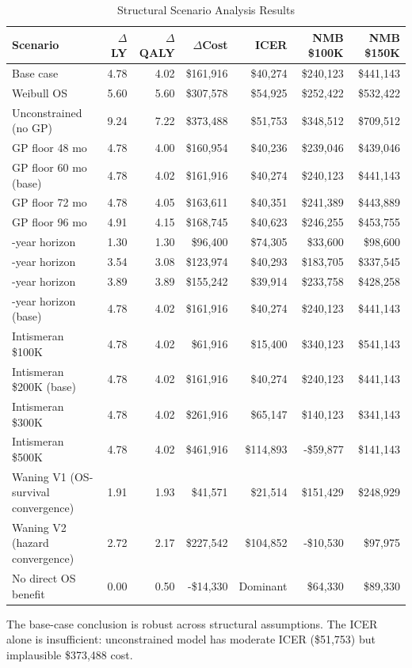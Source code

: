 \documentclass[11pt,a4paper]{article}
\begin{document}
\begin{landscape}
\begin{table}[p]
\centering
\caption{Structural Scenario Analysis Results}
\label{tab:s13}
\footnotesize
\setlength{\tabcolsep}{5pt}
\begin{tabularx}{\linewidth}{@{}>{\raggedright\arraybackslash}Xrrrrrr@{}}
\toprule
\textbf{Scenario} & \textbf{$\Delta$LY} & \textbf{$\Delta$QALY} & \textbf{$\Delta$Cost} & \textbf{ICER} & \textbf{NMB \$100K} & \textbf{NMB \$150K} \\
\midrule
Base case & 4.78 & 4.02 & \$161,916 & \$40,274 & \$240,123 & \$441,143 \\
Weibull OS & 5.60 & 5.60 & \$307,578 & \$54,925 & \$252,422 & \$532,422 \\
Unconstrained (no GP) & 9.24 & 7.22 & \$373,488 & \$51,753 & \$348,512 & \$709,512 \\
GP floor 48 mo & 4.78 & 4.00 & \$160,954 & \$40,236 & \$239,046 & \$439,046 \\
GP floor 60 mo (base) & 4.78 & 4.02 & \$161,916 & \$40,274 & \$240,123 & \$441,143 \\
GP floor 72 mo & 4.78 & 4.05 & \$163,611 & \$40,351 & \$241,389 & \$443,889 \\
GP floor 96 mo & 4.91 & 4.15 & \$168,745 & \$40,623 & \$246,255 & \$453,755 \\
10-year horizon & 1.30 & 1.30 & \$96,400 & \$74,305 & \$33,600 & \$98,600 \\
20-year horizon & 3.54 & 3.08 & \$123,974 & \$40,293 & \$183,705 & \$337,545 \\
30-year horizon & 3.89 & 3.89 & \$155,242 & \$39,914 & \$233,758 & \$428,258 \\
40-year horizon (base) & 4.78 & 4.02 & \$161,916 & \$40,274 & \$240,123 & \$441,143 \\
Intismeran \$100K & 4.78 & 4.02 & \$61,916 & \$15,400 & \$340,123 & \$541,143 \\
Intismeran \$200K (base) & 4.78 & 4.02 & \$161,916 & \$40,274 & \$240,123 & \$441,143 \\
Intismeran \$300K & 4.78 & 4.02 & \$261,916 & \$65,147 & \$140,123 & \$341,143 \\
Intismeran \$500K & 4.78 & 4.02 & \$461,916 & \$114,893 & -\$59,877 & \$141,143 \\
Waning V1 (OS-survival convergence) & 1.91 & 1.93 & \$41,571 & \$21,514 & \$151,429 & \$248,929 \\
Waning V2 (hazard convergence) & 2.72 & 2.17 & \$227,542 & \$104,852 & -\$10,530 & \$97,975 \\
No direct OS benefit & 0.00 & 0.50 & -\$14,330 & Dominant & \$64,330 & \$89,330 \\
\bottomrule
\end{tabularx}
\end{table}
\end{landscape}
\noindent The base-case conclusion is robust across structural assumptions. The ICER alone is insufficient: unconstrained model has moderate ICER (\$51,753) but implausible \$373,488 cost.
\end{document}
